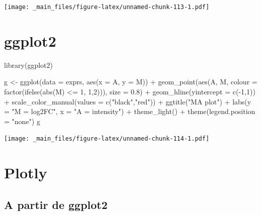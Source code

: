 \documentclass[
]{book}
\newenvironment{Shaded}{\begin{snugshade}}{\end{snugshade}}
\newcommand{\AttributeTok}[1]{\textcolor[rgb]{0.77,0.63,0.00}{#1}}
\newcommand{\DecValTok}[1]{\textcolor[rgb]{0.00,0.00,0.81}{#1}}
\newcommand{\FloatTok}[1]{\textcolor[rgb]{0.00,0.00,0.81}{#1}}
\newcommand{\FunctionTok}[1]{\textcolor[rgb]{0.00,0.00,0.00}{#1}}
\newcommand{\NormalTok}[1]{#1}
\newcommand{\OtherTok}[1]{\textcolor[rgb]{0.56,0.35,0.01}{#1}}
\newcommand{\SpecialCharTok}[1]{\textcolor[rgb]{0.00,0.00,0.00}{#1}}
\newcommand{\StringTok}[1]{\textcolor[rgb]{0.31,0.60,0.02}{#1}}
\begin{document}
\texttt{[image: \_main\_files/figure-latex/unnamed-chunk-113-1.pdf]}

\hypertarget{ggplot2}{%
\section{ggplot2}\label{ggplot2}}

\begin{Shaded}
\begin{Highlighting}[]
\FunctionTok{library}\NormalTok{(ggplot2)}

\NormalTok{g }\OtherTok{\textless{}{-}} \FunctionTok{ggplot}\NormalTok{(}\AttributeTok{data =}\NormalTok{ exprs, }\FunctionTok{aes}\NormalTok{(}\AttributeTok{x =}\NormalTok{ A, }\AttributeTok{y =}\NormalTok{ M)) }\SpecialCharTok{+}
  \FunctionTok{geom\_point}\NormalTok{(}\FunctionTok{aes}\NormalTok{(A, M, }\AttributeTok{colour =} \FunctionTok{factor}\NormalTok{(}\FunctionTok{ifelse}\NormalTok{(}\FunctionTok{abs}\NormalTok{(M) }\SpecialCharTok{\textless{}=} \DecValTok{1}\NormalTok{, }\DecValTok{1}\NormalTok{,}\DecValTok{2}\NormalTok{))), }\AttributeTok{size =} \FloatTok{0.8}\NormalTok{) }\SpecialCharTok{+} 
  \FunctionTok{geom\_hline}\NormalTok{(}\AttributeTok{yintercept =} \FunctionTok{c}\NormalTok{(}\SpecialCharTok{{-}}\DecValTok{1}\NormalTok{,}\DecValTok{1}\NormalTok{)) }\SpecialCharTok{+}
  \FunctionTok{scale\_color\_manual}\NormalTok{(}\AttributeTok{values =} \FunctionTok{c}\NormalTok{(}\StringTok{"black"}\NormalTok{,}\StringTok{"red"}\NormalTok{)) }\SpecialCharTok{+}
  \FunctionTok{ggtitle}\NormalTok{(}\StringTok{"MA plot"}\NormalTok{) }\SpecialCharTok{+} 
  \FunctionTok{labs}\NormalTok{(}\AttributeTok{y =} \StringTok{"M = log2FC"}\NormalTok{, }\AttributeTok{x =} \StringTok{"A = intensity"}\NormalTok{) }\SpecialCharTok{+} 
  \FunctionTok{theme\_light}\NormalTok{() }\SpecialCharTok{+} \FunctionTok{theme}\NormalTok{(}\AttributeTok{legend.position =} \StringTok{"none"}\NormalTok{)}
\NormalTok{g}
\end{Highlighting}
\end{Shaded}

\texttt{[image: \_main\_files/figure-latex/unnamed-chunk-114-1.pdf]}

\hypertarget{plotly}{%
\section{Plotly}\label{plotly}}

\hypertarget{a-partir-de-ggplot2}{%
\subsection{A partir de ggplot2}\label{a-partir-de-ggplot2}}
\end{document}
